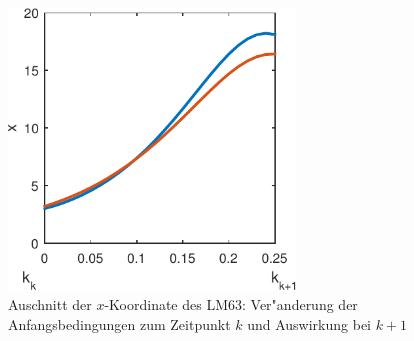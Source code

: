 \begin{refsection}
\begin{figure}
\centering
\includegraphics[width=3in]{kalman/figures/ablnachAnf2.pdf}
\caption{Auschnitt der $x$-Koordinate des LM63: Ver"anderung der Anfangsbedingungen zum Zeitpunkt $k$ und Auswirkung bei $k+1$}
\label{kalman:AblnachAnf}
\end{figure}


\end{refsection}
